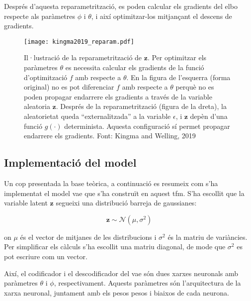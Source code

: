 \documentclass[CAT,BIB]{TFUOC}%
\begin{document}
        Després d'aquesta reparametrització,
        es poden calcular els gradients del \gls{elbo}
        respecte als paràmetres $\phi$ i $\theta$,
        i així optimitzar-los mitjançant el descens de gradients.

        \begin{figure}
            \centering
            \texttt{[image: kingma2019\_reparam.pdf]}
            \caption{
                Il·lustració de la reparametrització de $\mathbf{z}$.
                Per optimitzar els paràmetres $\theta$
                es necessita calcular els gradients de la funció d'optimització $f$
                amb respecte a $\theta$.
                En la figura de l'esquerra (forma original)
                no es pot diferenciar $f$ amb respecte a $\theta$
                perquè no es poden propagar endarrere els gradients
                a través de la variable aleatoria $\mathbf{z}$.
                Després de la reparametrització (figura de la dreta),
                la aleatorietat queda ``externalitzada'' a la variable $\epsilon$,
                i $\mathbf{z}$ depèn d'una funció $g(\cdot)$ determinista.
                Aquesta configuració sí permet propagar endarrere els gradients.
                Font: Kingma and Welling, 2019 \citep{Kingma2019}
            }
            \label{fig:reparametritzacio}
        \end{figure}

    \subsection{Implementació del model}
    \label{s:vae_implementacio}

        Un cop presentada la base teòrica,
        a continuació es resumeix com s'ha implementat el model \gls{vae}
        que s'ha construït en aquest \gls{tfm}.
        S'ha escollit que la variable latent $\mathbf{z}$
        segueixi una distribució barreja de gaussianes:

        $$\mathbf{z} \sim \mathcal{N}(\mu, \sigma^2)$$

        on $\mu$ és el vector de mitjanes de les distribucions
        i $\sigma^2$ és la matriu de variàncies.
        Per simplificar els càlculs s'ha escollit una matriu diagonal,
        de mode que $\sigma^2$ es pot escriure com un vector.

        Així, el codificador i el descodificador del \gls{vae} són
        dues xarxes neuronals amb paràmetres $\theta$ i $\phi$, respectivament.
        Aquests paràmetres són l'arquitectura de la xarxa neuronal,
        juntament amb els pesos pesos i biaixos de cada neurona.
\end{document}
